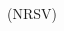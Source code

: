 \documentclass{article}
\begin{document}
\begin{paracol}{2}
\begin{column}
        (NRSV)
    \end{column}
\end{paracol}
\end{document}
